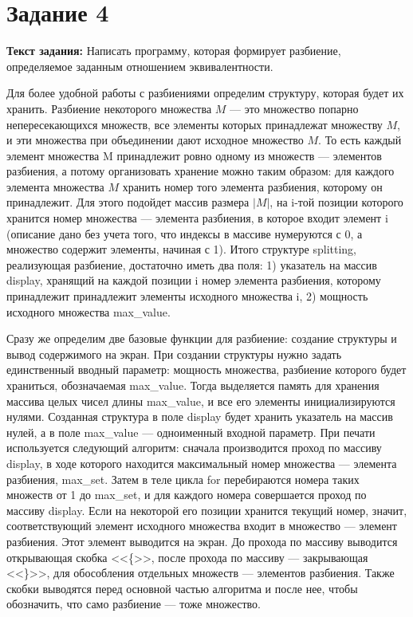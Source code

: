 \documentclass[12pt]{article}
\begin{document}
	\section{Задание 4}
	\label{task4}

	{\bf Текст задания:} Написать программу, которая формирует разбиение, определяемое заданным отношением эквивалентности. 
	
	Для более удобной работы с разбиениями определим структуру, которая будет их хранить. Разбиение некоторого множества $M$ --- это множество попарно непересекающихся множеств, все элементы которых принадлежат множеству $M$, и эти множества при объединении дают исходное множество $M$. То есть каждый элемент множества M принадлежит ровно одному из множеств --- элементов разбиения, а потому организовать хранение можно таким образом: для каждого элемента множества $M$ хранить номер того элемента разбиения, которому он принадлежит. Для этого подойдет массив размера $|M|$, на i-той позиции которого хранится номер множества --- элемента разбиения, в которое входит элемент i (описание дано без учета того, что индексы в массиве нумеруются с 0, а множество содержит элементы, начиная с 1). Итого структуре splitting, реализующая разбиение, достаточно иметь два поля: 1) указатель на массив display, хранящий на каждой позиции i номер элемента разбиения, которому принадлежит принадлежит элементы исходного множества i, 2) мощность исходного множества max\_value. 
	
	Сразу же определим две базовые функции для разбиение: создание структуры и вывод содержимого на экран. При создании структуры нужно задать единственный вводный параметр: мощность множества, разбиение которого будет храниться, обозначаемая max\_value. Тогда выделяется память для хранения массива целых чисел длины max\_value, и все его элементы инициализируются нулями. Созданная структура в поле display будет хранить указатель на массив нулей, а в поле max\_value --- одноименный входной параметр. При печати используется следующий алгоритм: сначала производится проход по массиву display, в ходе которого находится максимальный номер множества --- элемента разбиения, max\_set. Затем в теле цикла for перебираются номера таких множеств от 1 до max\_set, и для каждого номера совершается проход по массиву display. Если на некоторой его позиции хранится текущий номер, значит, соответствующий элемент исходного множества входит в множество --- элемент разбиения. Этот элемент выводится на экран. До прохода по массиву выводится открывающая скобка <<\{>>, после прохода по массиву --- закрывающая <<\}>>, для обособления отдельных множеств --- элементов разбиения. Также скобки выводятся перед основной частью алгоритма и после нее, чтобы обозначить, что само разбиение --- тоже множество.
	
\end{document}
